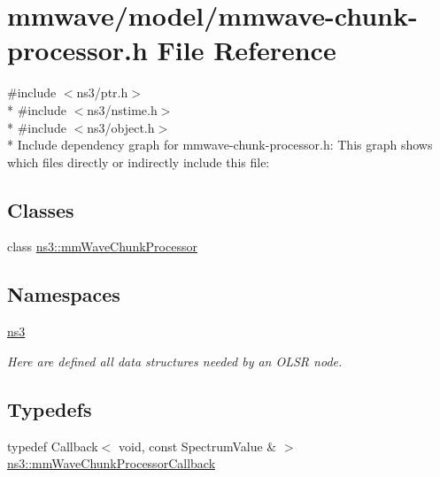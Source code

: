 \hypertarget{mmwave-chunk-processor_8h}{}\section{mmwave/model/mmwave-\/chunk-\/processor.h File Reference}
\label{mmwave-chunk-processor_8h}
{\ttfamily \#include $<$ns3/ptr.\+h$>$}\\*
{\ttfamily \#include $<$ns3/nstime.\+h$>$}\\*
{\ttfamily \#include $<$ns3/object.\+h$>$}\\*
Include dependency graph for mmwave-\/chunk-\/processor.h\+:
This graph shows which files directly or indirectly include this file\+:
\subsection*{Classes}
\begin{DoxyCompactItemize}
\item 
class \hyperlink{classns3_1_1mmWaveChunkProcessor}{ns3\+::mm\+Wave\+Chunk\+Processor}
\end{DoxyCompactItemize}
\subsection*{Namespaces}
\begin{DoxyCompactItemize}
\item 
 \hyperlink{namespacens3}{ns3}
\begin{DoxyCompactList}\small\item\em Here are defined all data structures needed by an O\+L\+SR node. \end{DoxyCompactList}\end{DoxyCompactItemize}
\subsection*{Typedefs}
\begin{DoxyCompactItemize}
\item 
typedef Callback$<$ void, const Spectrum\+Value \& $>$ \hyperlink{namespacens3_a30483c3f068c2b0abc969d692774446b}{ns3\+::mm\+Wave\+Chunk\+Processor\+Callback}
\end{DoxyCompactItemize}
